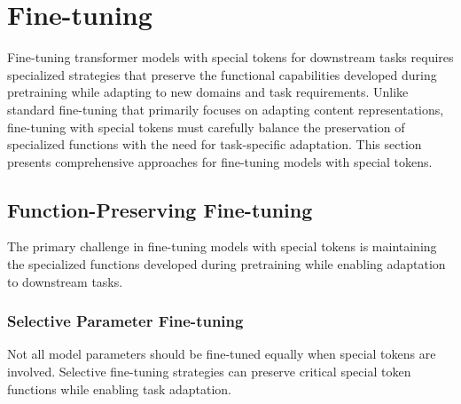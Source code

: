
\section{Fine-tuning}

Fine-tuning transformer models with special tokens for downstream tasks requires specialized strategies that preserve the functional capabilities developed during pretraining while adapting to new domains and task requirements. Unlike standard fine-tuning that primarily focuses on adapting content representations, fine-tuning with special tokens must carefully balance the preservation of specialized functions with the need for task-specific adaptation. This section presents comprehensive approaches for fine-tuning models with special tokens.
\begin{comment}
Feedback: Before diving into the specifics, it's helpful to frame the core challenge. For example: "The central dilemma of fine-tuning with special tokens is this: how do we adapt the model to a new task without making it 'forget' the crucial functions that the special tokens learned during pretraining? If we fine-tune the entire model aggressively on a new task, the [CLS] token might lose its ability to summarize, or the [SEP] token might no longer effectively separate segments. The strategies in this section are designed to navigate this trade-off between adaptation and preservation."
\end{comment}

\subsection{Function-Preserving Fine-tuning}

The primary challenge in fine-tuning models with special tokens is maintaining the specialized functions developed during pretraining while enabling adaptation to downstream tasks.

\subsubsection{Selective Parameter Fine-tuning}

Not all model parameters should be fine-tuned equally when special tokens are involved. Selective fine-tuning strategies can preserve critical special token functions while enabling task adaptation.
\begin{comment}
Feedback: A concrete example would make this concept much clearer. For instance: "A common and effective strategy is to use **differential learning rates**. You can set a much smaller learning rate for the embeddings of the special tokens (e.g., [CLS], [SEP]) and the lower layers of the transformer, while using a larger learning rate for the task-specific classification head and the top layers. This allows the task-specific parts of the model to adapt quickly while only making small, careful adjustments to the core, pre-trained functional components."
\end{comment}

